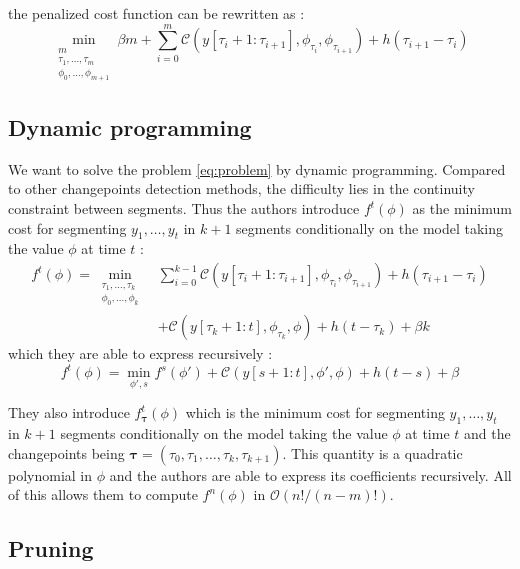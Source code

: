 \documentclass[11pt]{article}
\begin{document}
the penalized cost function can be rewritten as :
\begin{equation}
    \label{eq:problem}
    \min_{\substack{m\\\tau_1,\dots,\tau_m\\ \phi_0,\dots,\phi_{m+1}}} \beta m+\sum_{i=0}^m \mathcal{C}(y[\tau_i+1:\tau_{i+1}],\phi_{\tau_i},\phi_{\tau_{i+1}}) + h(\tau_{i+1}-\tau_i)
\end{equation}

\subsection{Dynamic programming}

We want to solve the problem \eqref{eq:problem} by dynamic programming. Compared to other changepoints detection methods, the difficulty lies in the continuity constraint between segments. Thus the authors introduce $f^t(\phi)$ as the minimum cost for segmenting $y_1,\dots,y_t$ in $k+1$ segments conditionally on the model taking the value $\phi$ at time $t$ :
\begin{equation}
    \begin{aligned}
        f^t(\phi)=\min_{\substack{\tau_1,\dots,\tau_{k}                         \\ \phi_0,\dots,\phi_k}} &\sum_{i=0}^{k-1} \mathcal{C}(y[\tau_i+1:\tau_{i+1}],\phi_{\tau_i},\phi_{\tau_{i+1}}) + h(\tau_{i+1}-\tau_i)\\
         & +\mathcal{C}(y[\tau_k+1:t],\phi_{\tau_k},\phi)+h(t-\tau_k) + \beta k
    \end{aligned}
\end{equation}
which they are able to express recursively :
\begin{equation}
    f^t(\phi)=\min_{\phi',s} f^s(\phi')+\mathcal{C}(y[s+1:t],\phi',\phi)+h(t-s)+\beta
\end{equation}

They also introduce $f^t_{\boldsymbol{\tau}}(\phi)$ which is the minimum cost for segmenting $y_1,\dots,y_t$ in $k+1$ segments conditionally on the model taking the value $\phi$ at time $t$ and the changepoints being $\boldsymbol{\tau}=(\tau_0,\tau_1,\dots,\tau_k,\tau_{k+1})$. This quantity is a quadratic polynomial in $\phi$ and the authors are able to express its coefficients recursively. All of this allows them to compute $f^n(\phi)$ in $\mathcal{O}(n!/(n-m)!)$.

\subsection{Pruning}
\end{document}
